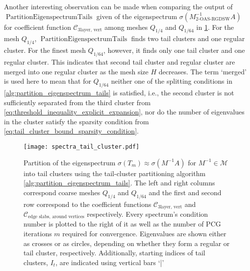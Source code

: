 Another interesting observation can be made when comparing the output of \newline$\operatorname{PartitionEigenspectrumTails}$ given of the eigenspectrum $\sigma(M_{\text{2-OAS-RGDSW}}^{-1}A)$ for coefficient function $\mathcal{C}_{\text{3layer, vert}}$ among meshes $Q_{1/4}$ and $Q_{1/64}$ in \cref{fig:partitioning_eigenspectrum_tails}. For the mesh $Q_{1/4}$, $\operatorname{PartitionEigenspectrumTails}$ finds two tail clusters and one regular cluster. For the finest mesh $Q_{1/64}$, however, it finds only one tail cluster and one regular cluster. This indicates that second tail cluster and regular cluster are merged into one regular cluster as the mesh size $H$ decreases. The term `merged' is used here to mean that for $Q_{1/64}$ neither one of the splitting conditions in \cref{alg:partition_eigenspectrum_tails} is satisfied, i.e., the second cluster is not sufficiently separated from the third cluster from \cref{eq:threshold_inequality_explicit_expansion}, nor do the number of eigenvalues in the cluster satisfy the sparsity condition from \cref{eq:tail_cluster_bound_sparsity_condition}. 
\begin{figure}[H]
    \centering
    \texttt{[image: spectra\_tail\_cluster.pdf]}
    \caption{Partition of the eigenspectrum $\sigma(T_m)\approx\sigma(M^{-1}A)$ for $M^{-1}\in\mathcal{M}$ into tail clusters using the tail-cluster partitioning algorithm \cref{alg:partition_eigenspectrum_tails}. The left and right columns correspond coarse meshes $Q_{1/4}$ and $Q_{1/64}$ and the first and second row correspond to the coefficient functions $\mathcal{C}_{\text{3layer, vert}}$ and $\mathcal{C}_{\text{edge slabs, around vertices}}$ respectively. Every spectrum's condition number is plotted to the right of it as well as the number of PCG iterations $m$ required for convergence. Eigenvalues are shown either as crosses or as circles, depending on whether they form a regular or tail cluster, respectively. Additionally, starting indices of tail clusters, $I_t$, are indicated using vertical bars `|'}
    \label{fig:partitioning_eigenspectrum_tails}
\end{figure}

